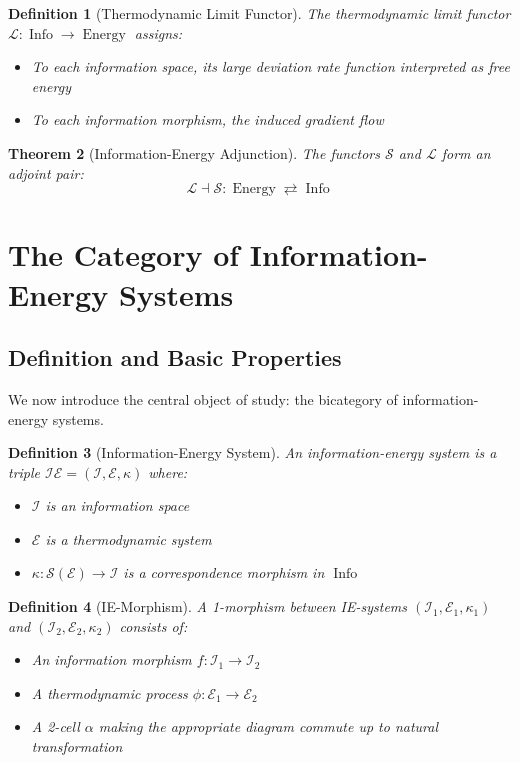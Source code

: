 \documentclass[12pt]{article}
\newtheorem{theorem}{Theorem}[section]
\newtheorem{definition}[theorem]{Definition}
\DeclareMathOperator{\Info}{Info}
\DeclareMathOperator{\Energy}{Energy}
\begin{document}
\begin{definition}[Thermodynamic Limit Functor]
The thermodynamic limit functor $\mathcal{L}: \Info \to \Energy$ assigns:
\begin{itemize}
\item To each information space, its large deviation rate function interpreted as free energy
\item To each information morphism, the induced gradient flow
\end{itemize}
\end{definition}

\begin{theorem}[Information-Energy Adjunction]
The functors $\mathcal{S}$ and $\mathcal{L}$ form an adjoint pair:
\[\mathcal{L} \dashv \mathcal{S}: \Energy \rightleftarrows \Info\]
\end{theorem}

\section{The Category of Information-Energy Systems}

\subsection{Definition and Basic Properties}

We now introduce the central object of study: the bicategory of information-energy systems.

\begin{definition}[Information-Energy System]
An information-energy system is a triple $\mathcal{IE} = (\mathcal{I}, \mathcal{E}, \kappa)$ where:
\begin{itemize}
\item $\mathcal{I}$ is an information space
\item $\mathcal{E}$ is a thermodynamic system
\item $\kappa: \mathcal{S}(\mathcal{E}) \to \mathcal{I}$ is a correspondence morphism in $\Info$
\end{itemize}
\end{definition}

\begin{definition}[IE-Morphism]
A 1-morphism between IE-systems $(\mathcal{I}_1, \mathcal{E}_1, \kappa_1)$ and $(\mathcal{I}_2, \mathcal{E}_2, \kappa_2)$ consists of:
\begin{itemize}
\item An information morphism $f: \mathcal{I}_1 \to \mathcal{I}_2$
\item A thermodynamic process $\phi: \mathcal{E}_1 \to \mathcal{E}_2$
\item A 2-cell $\alpha$ making the appropriate diagram commute up to natural transformation
\end{itemize}
\end{definition}
\end{document}
